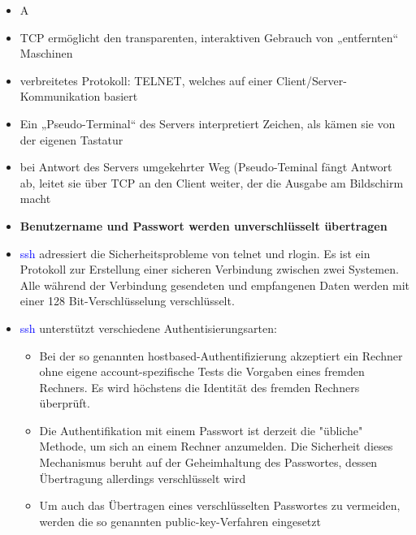 \begin{itemize}
    \item \todo A
\end{itemize}

\begin{itemize}
    \item TCP ermöglicht den transparenten, interaktiven Gebrauch von „entfernten“ Maschinen
    \item verbreitetes Protokoll: TELNET, welches auf einer Client/Server-Kommunikation basiert
    \item Ein „Pseudo-Terminal“ des Servers interpretiert Zeichen, als kämen sie von der eigenen Tastatur
    \item bei Antwort des Servers umgekehrter Weg (Pseudo-Teminal fängt Antwort ab, leitet sie über TCP an den Client weiter, der die Ausgabe am Bildschirm macht
    \item \textbf{Benutzername und Passwort werden unverschlüsselt übertragen}
\end{itemize}

\begin{itemize}
    \item \textcolor{blue}{ssh} adressiert die Sicherheitsprobleme von telnet und rlogin.
    Es ist ein Protokoll zur Erstellung einer sicheren Verbindung zwischen zwei Systemen.
    Alle während der Verbindung gesendeten und empfangenen Daten werden mit einer 128 Bit-Verschlüsselung verschlüsselt.
    \item \textcolor{blue}{ssh} unterstützt verschiedene Authentisierungsarten:
    \begin{itemize}
        \item Bei der so genannten hostbased-Authentifizierung akzeptiert ein Rechner ohne eigene account-spezifische Tests die Vorgaben eines fremden Rechners.
        Es wird höchstens die Identität des fremden Rechners überprüft.
        \item Die Authentifikation mit einem Passwort ist derzeit die "übliche" Methode, um sich an einem Rechner anzumelden.
        Die Sicherheit dieses Mechanismus beruht auf der Geheimhaltung des Passwortes, dessen Übertragung allerdings verschlüsselt wird
        \item Um auch das Übertragen eines verschlüsselten Passwortes zu vermeiden, werden die so genannten public-key-Verfahren eingesetzt
    \end{itemize}
\end{itemize}

